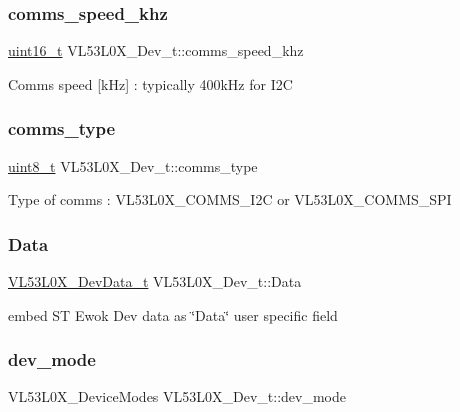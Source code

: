 \subsubsection{\texorpdfstring{comms\+\_\+speed\+\_\+khz}{comms\_speed\_khz}}
{\footnotesize\ttfamily \hyperlink{vl53l0x__types_8h_a273cf69d639a59973b6019625df33e30}{uint16\+\_\+t} V\+L53\+L0\+X\+\_\+\+Dev\+\_\+t\+::comms\+\_\+speed\+\_\+khz}

Comms speed \mbox{[}k\+Hz\mbox{]} \+: typically 400k\+Hz for I2C \mbox{\label{structVL53L0X__Dev__t_ad31ab98c8e3f4461d322f1089430e714}} 
\subsubsection{\texorpdfstring{comms\+\_\+type}{comms\_type}}
{\footnotesize\ttfamily \hyperlink{vl53l0x__types_8h_aba7bc1797add20fe3efdf37ced1182c5}{uint8\+\_\+t} V\+L53\+L0\+X\+\_\+\+Dev\+\_\+t\+::comms\+\_\+type}

Type of comms \+: V\+L53\+L0\+X\+\_\+\+C\+O\+M\+M\+S\+\_\+\+I2C or V\+L53\+L0\+X\+\_\+\+C\+O\+M\+M\+S\+\_\+\+S\+PI \mbox{\label{structVL53L0X__Dev__t_ab69036a33cb4bfdf295d53e1ab15ff54}} 
\subsubsection{\texorpdfstring{Data}{Data}}
{\footnotesize\ttfamily \hyperlink{structVL53L0X__DevData__t}{V\+L53\+L0\+X\+\_\+\+Dev\+Data\+\_\+t} V\+L53\+L0\+X\+\_\+\+Dev\+\_\+t\+::\+Data}

embed ST Ewok Dev data as \char`\"{}\+Data\char`\"{} user specific field \mbox{\label{structVL53L0X__Dev__t_a1a823e2387e3fa81bae5a1412ed52384}} 
\subsubsection{\texorpdfstring{dev\+\_\+mode}{dev\_mode}}
{\footnotesize\ttfamily V\+L53\+L0\+X\+\_\+\+Device\+Modes V\+L53\+L0\+X\+\_\+\+Dev\+\_\+t\+::dev\+\_\+mode}

